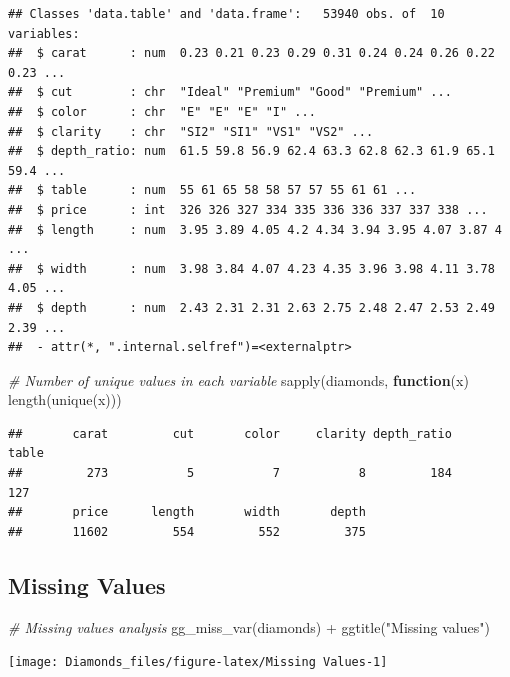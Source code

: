 \documentclass[
]{article}
\newenvironment{Shaded}{\begin{snugshade}}{\end{snugshade}}
\newcommand{\CommentTok}[1]{\textcolor[rgb]{0.56,0.35,0.01}{\textit{#1}}}
\newcommand{\ControlFlowTok}[1]{\textcolor[rgb]{0.13,0.29,0.53}{\textbf{#1}}}
\newcommand{\FunctionTok}[1]{\textcolor[rgb]{0.00,0.00,0.00}{#1}}
\newcommand{\NormalTok}[1]{#1}
\newcommand{\SpecialCharTok}[1]{\textcolor[rgb]{0.00,0.00,0.00}{#1}}
\newcommand{\StringTok}[1]{\textcolor[rgb]{0.31,0.60,0.02}{#1}}
\begin{document}
\begin{verbatim}
## Classes 'data.table' and 'data.frame':   53940 obs. of  10 variables:
##  $ carat      : num  0.23 0.21 0.23 0.29 0.31 0.24 0.24 0.26 0.22 0.23 ...
##  $ cut        : chr  "Ideal" "Premium" "Good" "Premium" ...
##  $ color      : chr  "E" "E" "E" "I" ...
##  $ clarity    : chr  "SI2" "SI1" "VS1" "VS2" ...
##  $ depth_ratio: num  61.5 59.8 56.9 62.4 63.3 62.8 62.3 61.9 65.1 59.4 ...
##  $ table      : num  55 61 65 58 58 57 57 55 61 61 ...
##  $ price      : int  326 326 327 334 335 336 336 337 337 338 ...
##  $ length     : num  3.95 3.89 4.05 4.2 4.34 3.94 3.95 4.07 3.87 4 ...
##  $ width      : num  3.98 3.84 4.07 4.23 4.35 3.96 3.98 4.11 3.78 4.05 ...
##  $ depth      : num  2.43 2.31 2.31 2.63 2.75 2.48 2.47 2.53 2.49 2.39 ...
##  - attr(*, ".internal.selfref")=<externalptr>
\end{verbatim}

\begin{Shaded}
\begin{Highlighting}[]
\CommentTok{\# Number of unique values in each variable}
\FunctionTok{sapply}\NormalTok{(diamonds, }\ControlFlowTok{function}\NormalTok{(x) }\FunctionTok{length}\NormalTok{(}\FunctionTok{unique}\NormalTok{(x)))}
\end{Highlighting}
\end{Shaded}

\begin{verbatim}
##       carat         cut       color     clarity depth_ratio       table
##         273           5           7           8         184         127
##       price      length       width       depth
##       11602         554         552         375
\end{verbatim}

\hypertarget{missing-values}{%
\subsection{Missing Values}\label{missing-values}}

\begin{Shaded}
\begin{Highlighting}[]
\CommentTok{\# Missing values analysis}
\FunctionTok{gg\_miss\_var}\NormalTok{(diamonds) }\SpecialCharTok{+} \FunctionTok{ggtitle}\NormalTok{(}\StringTok{"Missing values"}\NormalTok{)}
\end{Highlighting}
\end{Shaded}

\begin{center}\texttt{[image: Diamonds\_files/figure-latex/Missing Values-1]} \end{center}
\end{document}
